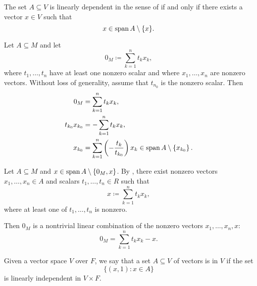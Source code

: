 \begin{Proposition}\label{thm:vector_space_linear_dependence}
  The set \( A \subseteq V \) is linearly dependent in the sense of  if and only if there exists a vector \( x \in V \) such that
  \begin{equation*}
    x \in \operatorname{span}{A} \setminus \{ x \}.
  \end{equation*}
\end{Proposition}
\begin{RefListProof}
    \ISufficiency Let \( A \subseteq M \) and let
    \begin{equation*}
      0_M \coloneqq \sum_{k=1}^n t_k x_k,
    \end{equation*}
    where \( t_1, \ldots, t_n \) have at least one nonzero scalar and where \( x_1, \ldots, x_n \) are nonzero vectors. Without loss of generality, assume that \( t_{n_0} \) is the nonzero scalar. Then
    \begin{align*}
      0_M &= \sum_{k=1}^n t_k x_k, \\
      t_{k_0} x_{k_0} &= -\sum_{k=1}^n t_k x_k, \\
      x_{k_0} &= \sum_{k=1}^n \left(-\frac {t_k} {t_{k_0}} \right) x_k \in \operatorname{span}{A} \setminus \left\{ x_{k_0} \right\}.
    \end{align*}

    \INecessity Let \( A \subseteq M \) and \( x \in \operatorname{span}{A} \setminus \{ 0_M, x \} \). By , there exist nonzero vectors \( x_1, \ldots, x_n \in A \) and scalars \( t_1, \ldots, t_n \in R \) such that
    \begin{equation*}
      x \coloneqq \sum_{k=1}^n t_k x_k,
    \end{equation*}
    where at least one of \( t_1, \ldots, t_n \) is nonzero.

    Then \( 0_M \) is a nontrivial linear combination of the nonzero vectors \( x_1, \ldots, x_n, x \):
    \begin{equation*}
      0_M = \sum_{k=1}^n t_k x_k - x.
    \end{equation*}
\end{RefListProof}

\begin{Definition}\label{affine_independence}
  Given a vector space \( V \) over \( F \), we say that a set \( A \subseteq V \) of vectors is  in \( V \) if the set
  \begin{equation*}
    \{ (x, 1) \colon x \in A \}
  \end{equation*}
  is linearly independent in \( V \times F \).
\end{Definition}

